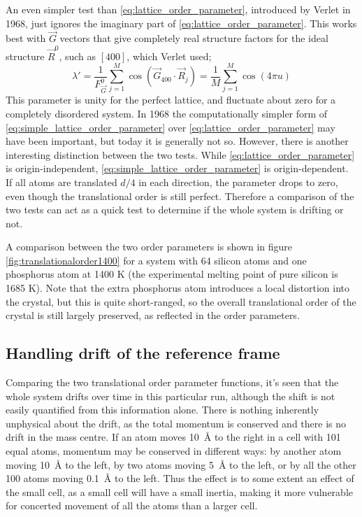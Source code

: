 \documentclass[11pt,bibliography=totoc,index=totoc]{scrbook}   %
\begin{document}
An even simpler test than \eqref{eq:lattice_order_parameter}, introduced by Verlet in 1968, just ignores the imaginary part of \eqref{eq:lattice_order_parameter}.\cite{Verlet:1968a}\cite[117]{Haile:1992} 
This works best with $\vec{G}$ vectors that give completely real structure factors for the ideal structure $\vec{R}^0$, such as $[400]$, which Verlet used;
\begin{equation}
    \lambda' = \frac{1}{F_{\vec{G}}^0} \sum_{j=1}^M \cos\left( \vec{G}_{400}\cdot\vec{R}_j \right) = \frac{1}{M}\sum_{j=1}^M \cos\left(4\pi u\right)
  \label{eq:simple_lattice_order_parameter}
\end{equation}
This parameter is unity for the perfect lattice, and fluctuate about zero for a completely disordered system.
In 1968 the computationally simpler form of \eqref{eq:simple_lattice_order_parameter} over \eqref{eq:lattice_order_parameter} may have been important, but today it is generally not so. 
However, there is another interesting distinction between the two tests. While \eqref{eq:lattice_order_parameter} is origin-independent, \eqref{eq:simple_lattice_order_parameter} is origin-dependent.
If all atoms are translated $d/4$ in each direction, the parameter drops to zero, even though the translational order is still perfect.
Therefore a comparison of the two tests can act as a quick test to determine if the whole system is drifting or not.

A comparison between the two order parameters is shown in figure \ref{fig:translationalorder1400} for a system
with 64 silicon atoms and one phosphorus atom at 1400 K (the experimental melting point of pure silicon is 1685 K).
Note that the extra phosphorus atom introduces a local distortion into the crystal, but this is quite short-ranged,
so the overall translational order of the crystal is still largely preserved, as reflected in the order parameters.

\subsection{Handling drift of the reference frame}\label{sec:drift}

Comparing the two translational order parameter functions, it's seen that the whole system drifts over time in this particular run, although the shift is not easily quantified from this information alone. 
There is nothing inherently unphysical about the drift, as the total momentum is conserved and there is no drift in the mass centre.
If an atom moves 10~Å to the right in a cell with 101 equal atoms, momentum may be conserved in different ways: by another atom moving 10~Å to the left, by two atoms moving 5~Å to the left, or by all the other 100 atoms moving 0.1~Å to the left.
Thus the effect is to some extent an effect of the small cell, as a small cell will have a small inertia, making it more vulnerable for concerted movement of all the atoms than a larger cell.
\end{document}
